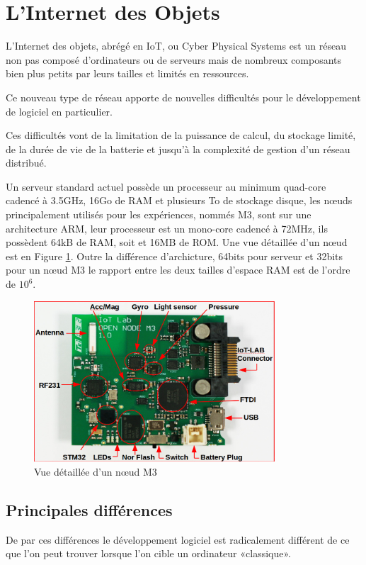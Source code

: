 \section{L'Internet des Objets}

L'Internet des objets, abrégé en IoT, ou Cyber Physical Systems est un réseau non pas composé d'ordinateurs ou de serveurs mais de nombreux composants bien plus petits par leurs tailles et limités en ressources.

Ce nouveau type de réseau apporte de nouvelles difficultés pour le développement de logiciel en particulier.

Ces difficultés vont de la limitation de la puissance de calcul, du stockage limité, de la durée de vie de la batterie et jusqu'à la complexité de gestion d'un réseau distribué.

Un serveur standard actuel possède un processeur au minimum quad-core cadencé à 3.5GHz, 16Go de RAM et plusieurs To de stockage disque, les nœuds principalement utilisés pour les expériences, nommés M3, sont sur une architecture ARM, leur processeur est un mono-core cadencé à 72MHz, ils possèdent 64kB de RAM, soit et 16MB de ROM. Une vue détaillée d'un nœud est en Figure \ref{m3}. Outre la différence d'archicture, 64bits pour serveur et 32bits pour un nœud M3 le rapport entre les deux tailles d'espace RAM est de l'ordre de $10^{6}$.

\begin{figure}[ht!]
\centering
\includegraphics[width=90mm]{images/m3opennode.png}
\caption{Vue détaillée d'un nœud M3}
\label{m3}
\end{figure}

\subsection{Principales différences}

De par ces différences le développement logiciel est radicalement différent de ce que l'on peut trouver lorsque l'on cible un ordinateur «classique».

